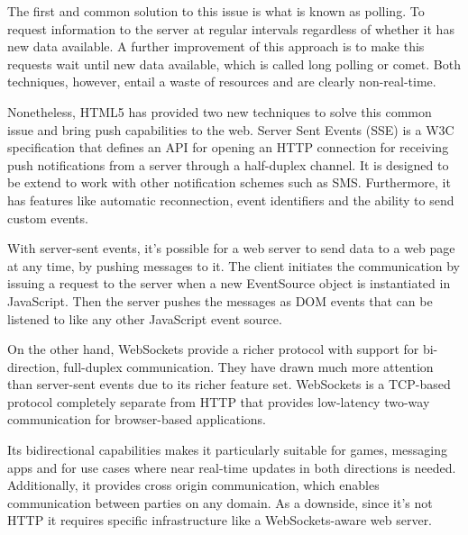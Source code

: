 The first and common solution to this issue is what is known as polling. To request information to the server at regular intervals regardless of whether it has new data available. A further improvement of this approach is to make this requests wait until new data available, which is called long polling or comet. Both techniques, however, entail a waste of resources and are clearly non-real-time.

Nonetheless, HTML5 has provided two new techniques to solve this common issue and bring push capabilities to the web. Server Sent Events (SSE) is a W3C specification \cite{SSE} that defines an API for opening an HTTP connection for receiving push notifications from a server through a half-duplex channel. It is designed to be extend to work with other notification schemes such as SMS. Furthermore, it has features like automatic reconnection, event identifiers and the ability to send custom events.

With server-sent events, it's possible for a web server to send data to a web page at any time, by pushing messages to it. The client initiates the communication by issuing a request to the server when a new EventSource object is instantiated in JavaScript. Then the server pushes the messages as DOM events that can be listened to like any other JavaScript event source.

On the other hand, WebSockets provide a richer protocol with support for bi-direction, full-duplex communication. They have drawn much more attention than server-sent events due to its richer feature set. WebSockets is a TCP-based protocol \cite{WS} completely separate from HTTP that provides low-latency two-way communication for browser-based applications.

Its bidirectional capabilities makes it particularly suitable for games, messaging apps and for use cases where near real-time updates in both directions is needed. Additionally, it provides cross origin communication, which enables communication between parties on any domain. As a downside, since it's not HTTP it requires specific infrastructure like a WebSockets-aware web server.

